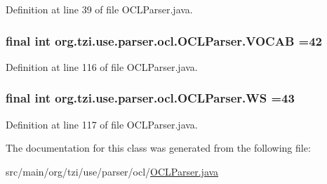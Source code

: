 Definition at line 39 of file O\-C\-L\-Parser.\-java.

\hypertarget{classorg_1_1tzi_1_1use_1_1parser_1_1ocl_1_1_o_c_l_parser_a47d84aa54e574d7c5821623aa70d8074}{
\subsubsection[{V\-O\-C\-A\-B}]{\setlength{\rightskip}{0pt plus 5cm}final int org.\-tzi.\-use.\-parser.\-ocl.\-O\-C\-L\-Parser.\-V\-O\-C\-A\-B =42\hspace{0.3cm}{\ttfamily [static]}}}\label{classorg_1_1tzi_1_1use_1_1parser_1_1ocl_1_1_o_c_l_parser_a47d84aa54e574d7c5821623aa70d8074}


Definition at line 116 of file O\-C\-L\-Parser.\-java.

\hypertarget{classorg_1_1tzi_1_1use_1_1parser_1_1ocl_1_1_o_c_l_parser_a2ea78b5efa518cce6ffa85f93a232d54}{
\subsubsection[{W\-S}]{\setlength{\rightskip}{0pt plus 5cm}final int org.\-tzi.\-use.\-parser.\-ocl.\-O\-C\-L\-Parser.\-W\-S =43\hspace{0.3cm}{\ttfamily [static]}}}\label{classorg_1_1tzi_1_1use_1_1parser_1_1ocl_1_1_o_c_l_parser_a2ea78b5efa518cce6ffa85f93a232d54}


Definition at line 117 of file O\-C\-L\-Parser.\-java.



The documentation for this class was generated from the following file\-:\begin{DoxyCompactItemize}
\item 
src/main/org/tzi/use/parser/ocl/\hyperlink{_o_c_l_parser_8java}{O\-C\-L\-Parser.\-java}\end{DoxyCompactItemize}
